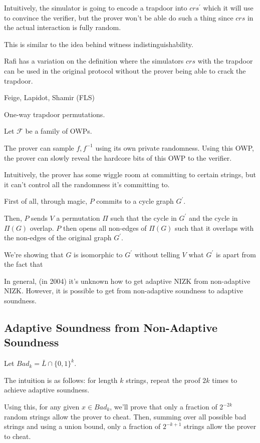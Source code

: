 \documentclass{article}
\theoremstyle{definition}
\newcommand{\bitstring}[1]{\{0,1\}^{#1}}
\begin{document}
Intuitively, the simulator is going to encode a trapdoor 
into $crs^{\prime}$ which it will use to convince the verifier, but
the prover won't be able do such a thing since $crs$ in the actual
interaction is fully random.

This is similar to the idea behind witness indistinguishability.

Rafi has a variation on the definition where the simulators
$crs$ with the trapdoor can be used in the original protocol
without the prover being able to crack the trapdoor.

Feige, Lapidot, Shamir (FLS)

One-way trapdoor permutations.

Let $\mathcal{F}$ be a family of OWPs.

The prover can sample $f, f^{-1}$ using its
own private randomness. Using this OWP, the prover
can slowly reveal the hardcore bits of this OWP to the
verifier.

Intuitively, the prover has some wiggle room at 
committing to certain strings, but it can't control
all the randomness it's committing to.

First of all, through magic, $P$ commits to
a cycle graph $G^{\prime}$. 

Then, $P$ sends $V$ a permutation $\Pi$ such that
the cycle in $G^{\prime}$ and the cycle in $\Pi(G)$ overlap.
$P$ then opens all non-edges of $\Pi(G)$ such that
it overlaps with the non-edges of the original graph $G^{\prime}$.

We're showing that $G$ is isomorphic to $G^{\prime}$
without telling $V$ what $G^{\prime}$ is apart from the
fact that

In general, (in 2004) it's unknown how to get adaptive
NIZK from non-adaptive NIZK. However, it is possible to
get from non-adaptive soundness to adaptive soundness.

\subsection{Adaptive Soundness from Non-Adaptive Soundness}

Let $Bad_{k} = \bar{L} \cap \bitstring{k}$.

The intuition is as follows: for length $k$ strings, repeat
the proof $2k$ times to achieve adaptive soundness.

Using this, for any given $x \in Bad_{k}$, we'll prove that
only a fraction of $2^{-2k}$ random strings allow the prover
to cheat. Then, summing over all possible bad strings and
using a union bound, only a fraction of $2^{-k + 1}$ strings
allow the prover to cheat.
\end{document}
